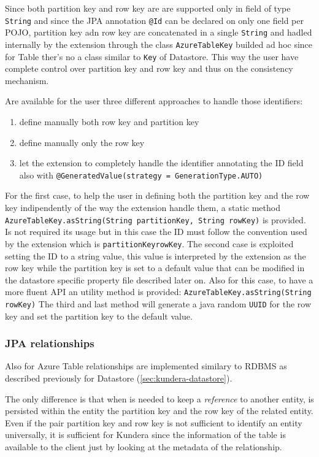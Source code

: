 Since both partition key and row key are are supported only in field of type \texttt{String} and since the JPA annotation \texttt{@Id} can be declared on only one field per POJO, partition key adn row key are concatenated in a single \texttt{String} and hadled internally by the extension through the class \texttt{AzureTableKey} builded ad hoc since for Table ther's no a class similar to \texttt{Key} of Datastore.
\noindent This way the user have complete control over partition key and row key and thus on the consistency mechanism.

\newparagraph Are available for the user three different approaches to handle those identifiers:
\begin{enumerate}
\item define manually both row key and partition key
\item define manually only the row key 
\item let the extension to completely handle the identifier annotating the ID field also with \texttt{@GeneratedValue(strategy = GenerationType.AUTO)}
\end{enumerate}

\noindent For the first case, to help the user in defining both the partition key and the row key indipendently of the way the extension handle them, a static method \texttt{AzureTableKey.asString(String partitionKey, String rowKey)} is provided. Is not required its usage but in this case the ID must follow the convention used by the extension which is \texttt{partitionKey\textunderscore rowKey}.
\noindent The second case is exploited setting the ID to a string value, this value is interpreted by the extension as the row key while the partition key is set to a default value that can be modified in the datastore specific property file described later on. Also for this case, to have a more fluent API an utility method is provided: \texttt{AzureTableKey.asString(String rowKey)} 
\noindent The third and last method will generate a java random \texttt{UUID} for the row key and set the partition key to the default value.

\subsubsection{JPA relationships}
Also for Azure Table relationships are implemented similary to RDBMS as described previously for Datastore (\ref{sec:kundera-datastore}).

\noindent The only difference is that when is needed to keep a \textit{reference} to another entity, is persisted within the entity the partition key and the row key of the related entity.
Even if the pair partition key and row key is not sufficient to identify an entity universally, it is sufficient for Kundera since the information of the table is available to the client just by looking at the metadata of the relationship. 


